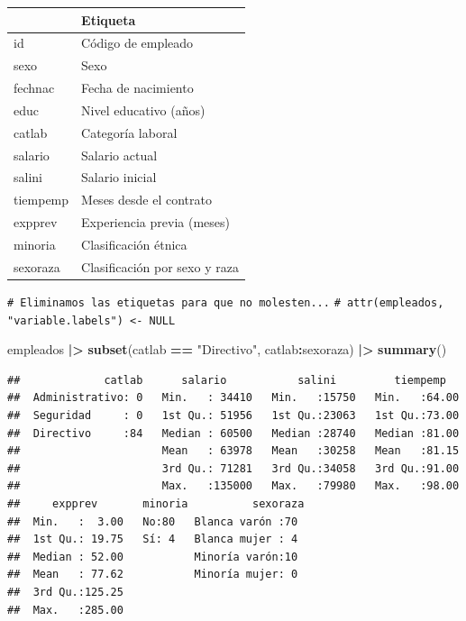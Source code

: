 \documentclass[
]{book}
\newenvironment{Shaded}{\begin{snugshade}}{\end{snugshade}}
\newcommand{\CommentTok}[1]{\textcolor[rgb]{0.56,0.35,0.01}{\textit{#1}}}
\newcommand{\FunctionTok}[1]{\textcolor[rgb]{0.13,0.29,0.53}{\textbf{#1}}}
\newcommand{\NormalTok}[1]{#1}
\newcommand{\SpecialCharTok}[1]{\textcolor[rgb]{0.81,0.36,0.00}{\textbf{#1}}}
\newcommand{\StringTok}[1]{\textcolor[rgb]{0.31,0.60,0.02}{#1}}
\theoremstyle{break}
\theoremstyle{nonumberplain}
\renewcommand{\CommentTok}[1]{\textcolor[rgb]{0.41,0.41,0.41}{\texttt{#1}}}
\begin{document}
\begin{tabular}{l|l}
\hline
  & Etiqueta\\
\hline
id & Código de empleado\\
\hline
sexo & Sexo\\
\hline
fechnac & Fecha de nacimiento\\
\hline
educ & Nivel educativo  (años)\\
\hline
catlab & Categoría laboral\\
\hline
salario & Salario actual\\
\hline
salini & Salario inicial\\
\hline
tiempemp & Meses desde el contrato\\
\hline
expprev & Experiencia previa (meses)\\
\hline
minoria & Clasificación étnica\\
\hline
sexoraza & Clasificación por sexo y raza\\
\hline
\end{tabular}

\begin{Shaded}
\begin{Highlighting}[]
\CommentTok{\# Eliminamos las etiquetas para que no molesten...}
\CommentTok{\# attr(empleados, "variable.labels") \textless{}{-} NULL  }

\NormalTok{empleados }\SpecialCharTok{|\textgreater{}}  \FunctionTok{subset}\NormalTok{(catlab }\SpecialCharTok{==} \StringTok{"Directivo"}\NormalTok{, catlab}\SpecialCharTok{:}\NormalTok{sexoraza) }\SpecialCharTok{|\textgreater{}}  \FunctionTok{summary}\NormalTok{()}
\end{Highlighting}
\end{Shaded}

\begin{verbatim}
##             catlab      salario           salini         tiempemp    
##  Administrativo: 0   Min.   : 34410   Min.   :15750   Min.   :64.00  
##  Seguridad     : 0   1st Qu.: 51956   1st Qu.:23063   1st Qu.:73.00  
##  Directivo     :84   Median : 60500   Median :28740   Median :81.00  
##                      Mean   : 63978   Mean   :30258   Mean   :81.15  
##                      3rd Qu.: 71281   3rd Qu.:34058   3rd Qu.:91.00  
##                      Max.   :135000   Max.   :79980   Max.   :98.00  
##     expprev       minoria          sexoraza 
##  Min.   :  3.00   No:80   Blanca varón :70  
##  1st Qu.: 19.75   Sí: 4   Blanca mujer : 4  
##  Median : 52.00           Minoría varón:10  
##  Mean   : 77.62           Minoría mujer: 0  
##  3rd Qu.:125.25                             
##  Max.   :285.00
\end{verbatim}
\end{document}
